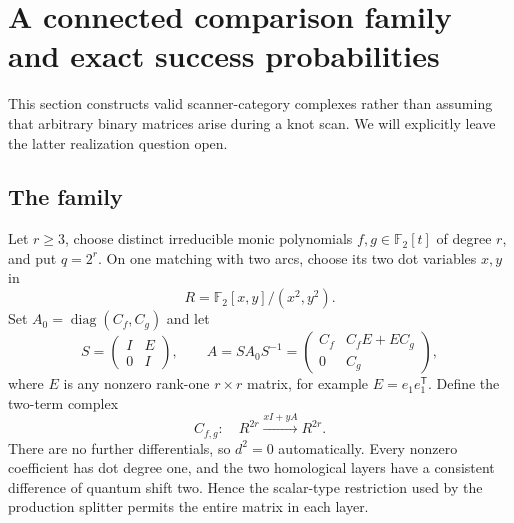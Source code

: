 \documentclass[11pt,a4paper]{article}
\theoremstyle{definition}\newtheorem{definition}[theorem]{Definition}
\theoremstyle{remark}\newtheorem{remark}[theorem]{Remark}
\newcommand{\F}{\mathbb F_2}
\begin{document}
\section{A connected comparison family and exact success probabilities}
\label{sec:family}

This section constructs valid scanner-category complexes rather than
assuming that arbitrary binary matrices arise during a knot scan. We will
explicitly leave the latter realization question open.

\subsection{The family}

Let $r\ge3$, choose distinct irreducible monic polynomials $f,g\in\F[t]$ of
degree $r$, and put $q=2^r$. On one matching with two arcs, choose its two
dot variables $x,y$ in
\[
 R=\F[x,y]/(x^2,y^2).
\]
Set $A_0=\operatorname{diag}(C_f,C_g)$ and let
\[
 S=\begin{pmatrix}I&E\\0&I\end{pmatrix},\qquad
 A=SA_0S^{-1}
   =\begin{pmatrix}C_f&C_fE+EC_g\\0&C_g\end{pmatrix},
\]
where $E$ is any nonzero rank-one $r\times r$ matrix, for example
$E=e_1e_1^{\mathsf T}$. Define the two-term complex
\begin{equation}\label{eq:family}
 C_{f,g}:\quad R^{2r}\xrightarrow{xI+yA}R^{2r}.
\end{equation}
There are no further differentials, so $d^2=0$ automatically. Every nonzero
coefficient has dot degree one, and the two homological layers have a
consistent difference of quantum shift two. Hence the scalar-type
restriction used by the production splitter permits the entire matrix in
each layer.
\end{document}
